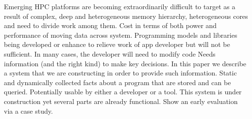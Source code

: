 Emerging HPC platforms are becoming extraordinarily difficult to target as a result of complex, deep  and heterogeneous memory hierarchy, heterogeneous cores and need to divide work among them. Cost in terms of both power and performance of moving data across system.
Programming models and libraries being developed or enhance to relieve work of app developer but will not be sufficient. In many cases, the developer will need to modify code 
Needs information (and the right kind) to make key decisions.
In this paper we describe a system that we are constructing in order to provide such information. Static and dynamically collected facts about a program that are stored and can be queried. Potentially usable by either a developer or a tool. This system is under construction yet several parts are already functional. 
Show an early evaluation via a case study.
\cite{polybench}